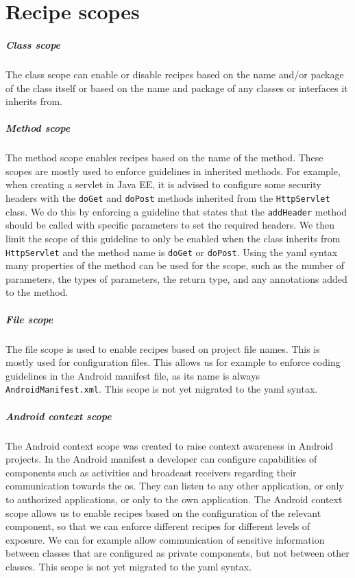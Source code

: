 \chapter{Recipe scopes}
\label{app:recipe-scopes}
\paragraph{Class scope} The class scope can enable or disable recipes based on the name and/or package of the class itself or based on the name and package of any classes or interfaces it inherits from. 

\paragraph{Method scope} The {method scope} enables recipes based on the name of the method. These scopes are mostly used to enforce guidelines in inherited methods. For example, when creating a servlet in Java EE, it is advised to configure some security headers with the \texttt{doGet} and \texttt{doPost} methods inherited from the \texttt{HttpServlet} class. We do this by enforcing a guideline that states that the \texttt{addHeader} method should be called with specific parameters to set the required headers. We then limit the scope of this guideline to only be enabled when the class inherits from \texttt{HttpServlet} and the method name is  \texttt{doGet} or \texttt{doPost}. Using the \gls{yaml} syntax many properties of the method can be used for the scope, such as the number of parameters, the types of parameters, the return type, and any annotations added to the method.

\paragraph{File scope} The {file scope} is used to enable recipes based on project file names. This is mostly used for configuration files. This allows us for example to enforce coding guidelines in the Android manifest file, as its name is always \texttt{AndroidManifest.xml}. This scope is not yet migrated to the \gls{yaml} syntax.

\paragraph{Android context scope} The {Android context scope} was created to raise context awareness in Android projects. In the Android manifest a developer can configure capabilities of components such as activities and broadcast receivers regarding their communication towards the \gls{os}. They can listen to any other application, or only to authorized applications, or only to the own application. The Android context scope allows us to enable recipes based on the configuration of the relevant component, so that we can enforce different recipes for different levels of exposure. We can for example allow communication of sensitive information between classes that are configured as private components, but not between other classes. This scope is not yet migrated to the \gls{yaml} syntax.

